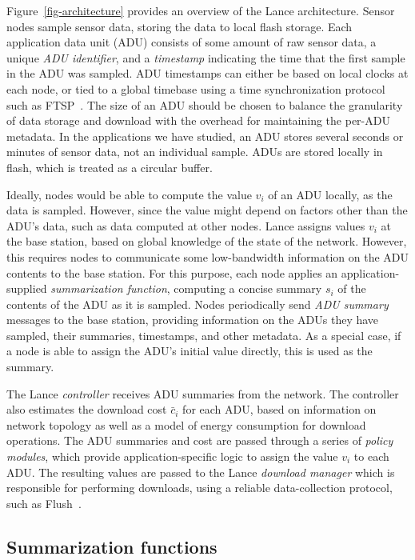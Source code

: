 \documentclass[lettersize]{sig-alternate-konrad}
\begin{document}
Figure~\ref{fig-architecture} provides an overview of the Lance
architecture. Sensor nodes sample sensor data, storing the
data to local flash storage. Each application data unit (ADU)
consists of
some amount of raw sensor data, a unique {\em ADU identifier}, and a 
{\em timestamp} indicating the time that the first sample in the ADU
was sampled. ADU timestamps can either be based on local clocks at
each node, or tied to a global timebase using a time synchronization
protocol such as FTSP~\cite{ftsp}. The size of an ADU should be
chosen to balance the granularity of data storage and download with
the overhead for maintaining the per-ADU metadata. In the applications
we have studied, an ADU stores several seconds or minutes 
of sensor data, not an individual sample. ADUs are stored
locally in flash, which is treated as a circular buffer.

Ideally, nodes would be able to compute the value $v_i$ of an ADU
locally, as the data is sampled. However, since the value might depend
on factors other than the ADU's data, such as data computed at
other nodes. Lance assigns values $v_i$ at the base station,
based on global knowledge of the state of the network. However, this
requires nodes to communicate some low-bandwidth information on the ADU
contents to the base station.  For this purpose, each node applies an
application-supplied {\em summarization function}, computing a 
concise summary $s_i$ of the contents of the ADU as it is sampled.
Nodes periodically send {\em ADU summary} messages to the
base station, providing information on the ADUs they have sampled,
their summaries, timestamps, and other metadata. As a special case,
if a node is able to assign the ADU's initial value directly, this is used
as the summary.

The Lance {\em controller} receives ADU summaries from the network.
The controller also estimates the download cost $\bar{c}_i$ for each
ADU, based on information on network topology as well as a model of
energy consumption for download operations. The ADU summaries and cost
are passed through a series of {\em policy modules}, which provide
application-specific logic to assign the value $v_i$ to each ADU.
The resulting values are passed to the Lance {\em download manager}
which is responsible for performing downloads, using a reliable
data-collection protocol, such as Flush~\cite{flush-sensys07}.

\subsection{Summarization functions}
\end{document}
